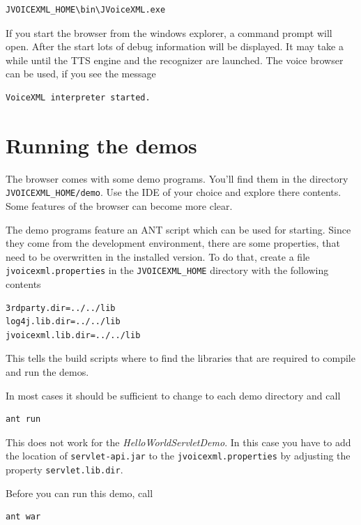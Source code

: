 \documentclass[11pt,a4paper]{article}
\begin{document}
\begin{lstlisting}
JVOICEXML_HOME\bin\JVoiceXML.exe
\end{lstlisting}

If you start the browser from the windows explorer, a command prompt will open.
After the start lots of debug information will be displayed.
It may take a while until the TTS engine and the recognizer are launched.
The voice browser can be used, if you see the message

\begin{lstlisting}
VoiceXML interpreter started.
\end{lstlisting}

\section{Running the demos}

The browser comes with some demo programs. You'll find them in the
directory \texttt{JVOICEXML\_HOME/demo}. Use the IDE of your choice
and explore there contents. Some features of the browser can 
become more clear.

The demo programs feature an ANT script which can be used for starting.
Since they come from the development environment, there are some
properties, that need to be overwritten in the installed version.
To do that, create a file \texttt{jvoicexml.properties} in the
\texttt{JVOICEXML\_HOME} directory with the following contents

\begin{lstlisting}
3rdparty.dir=../../lib
log4j.lib.dir=../../lib
jvoicexml.lib.dir=../../lib
\end{lstlisting}

This tells the build scripts where to find the libraries that are required
to compile and run the demos.

In most cases it should be sufficient to change to each demo directory
and call

\begin{lstlisting}
ant run
\end{lstlisting}

This does not work for the \emph{HelloWorldServletDemo}. In this
case you have to add the location of \texttt{servlet-api.jar} to
the \texttt{jvoicexml.properties} by adjusting the property
\texttt{servlet.lib.dir}.

Before you can run this demo, call

\begin{lstlisting}
ant war
\end{lstlisting}
\end{document}
